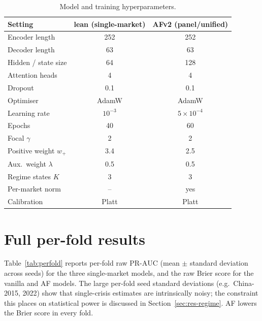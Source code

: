\documentclass[11pt,a4paper]{article}
\newcommand{\prauc}{\mbox{PR-AUC}}
\begin{document}
\begin{table}[h]
\centering\small
\caption{Model and training hyperparameters.}
\label{tab:hyper}
\begin{tabular}{lcc}
\toprule
Setting & lean (single-market) & AFv2 (panel/unified) \\
\midrule
Encoder length & 252 & 252 \\
Decoder length & 63 & 63 \\
Hidden / state size & 64 & 128 \\
Attention heads & 4 & 4 \\
Dropout & 0.1 & 0.1 \\
Optimiser & AdamW & AdamW \\
Learning rate & $10^{-3}$ & $5\times10^{-4}$ \\
Epochs & 40 & 60 \\
Focal $\gamma$ & 2 & 2 \\
Positive weight $w_{+}$ & 3.4 & 2.5 \\
Aux.\ weight $\lambda$ & 0.5 & 0.5 \\
Regime states $K$ & 3 & 3 \\
Per-market norm & -- & yes \\
Calibration & Platt & Platt \\
\bottomrule
\end{tabular}
\end{table}

\section{Full per-fold results}
\label{app:perfold}
Table~\ref{tab:perfold} reports per-fold raw $\prauc$ (mean $\pm$ standard
deviation across seeds) for the three single-market models, and the raw Brier
score for the vanilla and AF models. The large per-fold seed standard
deviations (e.g.\ China-2015, 2022) show that single-crisis estimates are
intrinsically noisy; the constraint this places on statistical power is
discussed in Section~\ref{sec:res-regime}. AF lowers the Brier score in every
fold.
\end{document}
